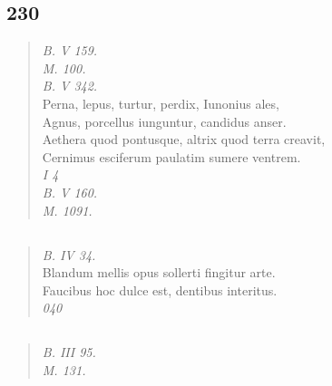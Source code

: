\documentclass[11pt, a4paper]{report}
\begin{document}
            \subsection*{230}
      \begin{verse}
      \textit{B. V 159.} \\ \textit{M. 100.} \\ \textit{B. V 342.} \\ Perna, lepus, turtur, perdix, Iunonius ales, \\ Agnus, porcellus iunguntur, candidus anser. \\ Aethera quod pontusque, altrix quod terra creavit, \\ Cernimus esciferum paulatim sumere ventrem. \\ \textit{I 4} \\ \textit{B. V 160.} \\ \textit{M. 1091.} \\ 
      \end{verse}
  
            \subsection*{}
      \begin{verse}
      \textit{B. IV 34.} \\ Blandum mellis opus sollerti fingitur arte. \\ Faucibus hoc dulce est, dentibus interitus. \\ \textit{040} \\ 
      \end{verse}
  
            \subsection*{}
      \begin{verse}
      \textit{B. III 95.} \\ \textit{M. 131.} \\ 
      \end{verse}
  
\end{document}
